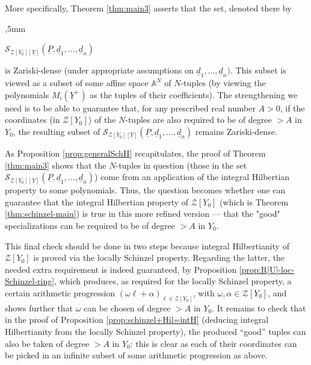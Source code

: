 \documentclass[11pt,a4paper,reqno]{amsart}
\theoremstyle{definition}
\begin{document}
More specifically, Theorem \ref{thm:main3} asserts that the set, denoted there by 

,5mm

\centerline{${\mathcal S}_{{\mathcal Z}[Y_0][\underline Y]}(\underline P,{\underline d}_1,\ldots,{\underline d}_n)$} 
\vskip 1mm


 
\noindent
is Zariski-dense (under appropriate assumptions on ${\underline d}_1,\ldots,{\underline d}_n)$. This subset is viewed as a subset of some affine space ${\mathbb A}^N$ of $N$-tuples (by viewing the polynomials $M_i (\underline Y^+)$ as the tuples of their coefficients). The strengthening we need is to be able to guarantee that, for any prescribed real number $A>0$, if the coordinates 
(in ${\mathcal Z}[Y_0]$) of the $N$-tuples are also required to be of degree $> A$  in $Y_0$, the resulting 
subset of ${\mathcal S}_{{\mathcal Z}[Y_0][\underline Y]}(\underline P,{\underline d}_1,\ldots,{\underline d}_n)$ remains Zariski-dense.

As Proposition \ref{prop:generalSchH} recapitulates, the proof of Theorem \ref{thm:main3} shows that the 
$N$-tuples in question (those in the set ${\mathcal S}_{{\mathcal Z}[Y_0][\underline Y]}(\underline P,{\underline d}_1,\ldots,{\underline d}_n)$) come from an application of the 
integral Hilbertian property to some polynomials. Thus, the question becomes 
whether one can guarantee that the integral Hilbertian property of ${\mathcal Z}[Y_0]$  
(which is Theorem \ref{thm:schinzel-main}) is true in this more refined version --- that the "good" 
specializations can be required to be of degree 
$> A $ in $Y_0$. 

This final check should be done in two steps because integral Hilbertianity of ${\mathcal Z}[Y_0]$ is proved via the locally Schinzel property. Regarding the latter, the needed extra requirement is indeed guaranteed, by Proposition \ref{prop:R[U]-loc-Schinzel-ring}, which produces, as required for the locally Schinzel property, a certain arithmetic progression $(\omega \ell + \alpha)_{\ell \in {\mathcal Z}[Y_0]}$, with $\omega, \alpha \in {\mathcal Z}[Y_0]$, and shows further that  $\omega$ can be chosen of degree $>A$ in $Y_0$. It remains to check that in the proof of Proposition \ref{prop:schinzel+Hil=intH} (deducing integral Hilbertianity from the locally Schinzel property), the produced ``good'' tuples can also be taken of degree $>A$ in $Y_0$: this is clear as each of their coordinates can be picked in an infinite subset of some arithmetic progression as above.
\end{document}
